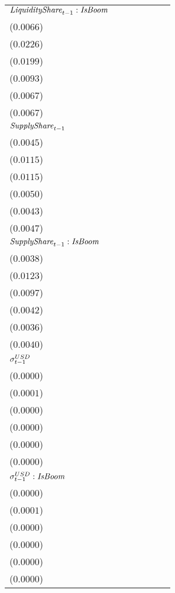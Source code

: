 \begin{tabular}{lllllll}
${\it LiquidityShare}_{t-1}:{\it IsBoom}$ & \makecell{$-0.0146^{**}$ \\ ($0.0066$)} & \makecell{$-0.0050^{}$ \\ ($0.0226$)} & \makecell{$0.0304^{}$ \\ ($0.0199$)} & \makecell{$0.0222^{**}$ \\ ($0.0093$)} & \makecell{$0.0122^{*}$ \\ ($0.0067$)} & \makecell{$-0.0072^{}$ \\ ($0.0067$)} \\
${\it SupplyShare}_{t-1}$ & \makecell{$0.0189^{***}$ \\ ($0.0045$)} & \makecell{$0.0353^{***}$ \\ ($0.0115$)} & \makecell{$0.0505^{***}$ \\ ($0.0115$)} & \makecell{$0.0102^{**}$ \\ ($0.0050$)} & \makecell{$0.0047^{}$ \\ ($0.0043$)} & \makecell{$0.0233^{***}$ \\ ($0.0047$)} \\
${\it SupplyShare}_{t-1}:{\it IsBoom}$ & \makecell{$-0.0022^{}$ \\ ($0.0038$)} & \makecell{$0.0176^{}$ \\ ($0.0123$)} & \makecell{$-0.0285^{***}$ \\ ($0.0097$)} & \makecell{$-0.0045^{}$ \\ ($0.0042$)} & \makecell{$-0.0017^{}$ \\ ($0.0036$)} & \makecell{$-0.0056^{}$ \\ ($0.0040$)} \\
${\it \sigma}^{USD}_{t-1}$ & \makecell{$-0.0000^{***}$ \\ ($0.0000$)} & \makecell{$-0.0003^{***}$ \\ ($0.0001$)} & \makecell{$0.0000^{***}$ \\ ($0.0000$)} & \makecell{$0.0000^{***}$ \\ ($0.0000$)} & \makecell{$0.0000^{***}$ \\ ($0.0000$)} & \makecell{$-0.0000^{***}$ \\ ($0.0000$)} \\
${\it \sigma}^{USD}_{t-1}:{\it IsBoom}$ & \makecell{$0.0001^{***}$ \\ ($0.0000$)} & \makecell{$0.0004^{***}$ \\ ($0.0001$)} & \makecell{$-0.0001^{***}$ \\ ($0.0000$)} & \makecell{$-0.0000^{***}$ \\ ($0.0000$)} & \makecell{$-0.0000^{***}$ \\ ($0.0000$)} & \makecell{$0.0000^{***}$ \\ ($0.0000$)} \\

\end{tabular}
